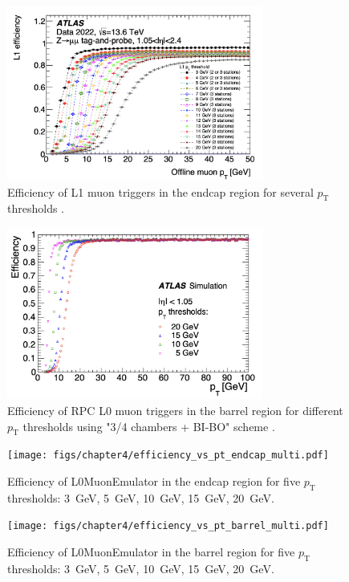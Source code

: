 \begin{figure}[htbp]
  \centering
  \includegraphics[width=0.75\textwidth]{figs/chapter4/L1Muon_endcap_eff.png}
  \caption{Efficiency of L1 muon triggers in the endcap region for several $p_\mathrm{T}$ thresholds \cite{ATLASRun3Trigger}.}
  \label{fig:L1MuonEndcapEff}
\end{figure}

\begin{figure}[htbp]
  \centering
  \includegraphics[width=0.75\textwidth]{figs/chapter4/L0Muon_barrel_eff.png}
  \caption{Efficiency of RPC L0 muon triggers in the barrel region for different $p_\mathrm{T}$ thresholds using "3/4 chambers + BI-BO" scheme \cite{TDAQ_TDR}.}
  \label{fig:L0MuonBarrelEff}
\end{figure}


\begin{figure}[htbp]
  \centering
  \texttt{[image: figs/chapter4/efficiency\_vs\_pt\_endcap\_multi.pdf]}
  \caption{Efficiency of L0MuonEmulator in the endcap region for five $p_\mathrm{T}$ thresholds: 3~GeV, 5~GeV, 10~GeV, 15~GeV, 20~GeV.}
  \label{fig:eff_pt_endcap}
\end{figure}

\begin{figure}[htbp]
  \centering
  \texttt{[image: figs/chapter4/efficiency\_vs\_pt\_barrel\_multi.pdf]}
  \caption{Efficiency of L0MuonEmulator in the barrel region for five $p_\mathrm{T}$ thresholds: 3~GeV, 5~GeV, 10~GeV, 15~GeV, 20~GeV.}
  \label{fig:eff_pt_barrel}
\end{figure}

